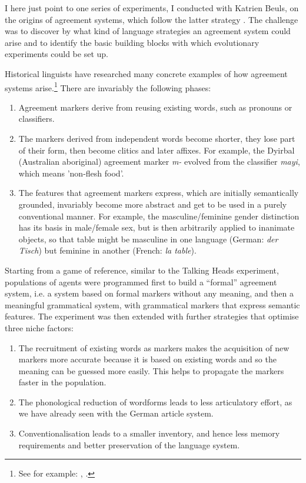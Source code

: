 I here just point to one series of experiments, I conducted with Katrien Beuls, on the origins of agreement 
systems, which follow the latter strategy \cite{Beuls:2013}. The challenge was to discover by 
what kind of language strategies an agreement system could arise and to identify the basic building blocks with which 
evolutionary experiments could be set up. 

Historical linguists have researched many concrete examples of how agreement systems arise.\footnote{See for example: \cite{Lehmann:1988}, \cite{Luraghi:2011}.}
There are invariably the following phases: 
\begin{enumerate}
\item Agreement markers derive from reusing existing words, such as pronouns or classifiers. 
\item The markers derived from independent words become shorter, they lose part of their form, 
then become clitics and later affixes. For example, the Dyirbal (Australian aboriginal)
agreement marker {\itshape m-} evolved from the classifier {\itshape mayi}, which means 'non-flesh food'. 
\item The features that agreement markers express, which are initially semantically 
grounded, invariably become more abstract and get to be used in 
a purely conventional manner. For example, the masculine/feminine 
gender distinction has its basis in male/female sex, but is then arbitrarily applied to inanimate objects, so that table 
might be masculine in one language (German: {\itshape der Tisch}) but feminine in another (French: {\itshape la table}). 
\end{enumerate}
Starting from a game of reference, similar to the Talking Heads experiment, populations of agents were programmed 
first to build a ``formal'' agreement system, i.e. a system based on formal markers without any meaning, and then 
a meaningful grammatical system, with grammatical markers that express semantic features. The experiment was 
then extended with further strategies that optimise three niche factors:
\begin{enumerate}
\item The recruitment of existing words as markers makes the acquisition of new markers more accurate because it is based 
on existing words and so the meaning can be guessed more easily. This helps to propagate the markers faster in the population. 
\item The phonological reduction of wordforms leads to less articulatory effort, as we have already seen with the German 
article system. 
\item Conventionalisation leads to a smaller inventory, and hence less memory requirements and better preservation of the 
language system. 
\end{enumerate}

